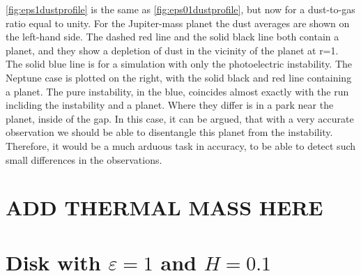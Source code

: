 \documentclass[onecolumn]{report}
\newcommand{\epsi}{\varepsilon}
\begin{document}
\ref{fig:eps1dustprofile} is the same as \ref{fig:eps01dustprofile}, but now for a dust-to-gas ratio equal to unity. For the Jupiter-mass planet the dust averages are shown on the left-hand side. The dashed red line and the solid black line both contain a planet, and they show a depletion of dust in the vicinity of the planet at r=1. The solid blue line is for a simulation with only the photoelectric instability. The Neptune case is plotted on the right, with the solid black and red line containing a planet. The pure instability, in the blue, coincides almost exactly with the run incliding the instability and a planet. Where they differ is in a park near the planet, inside of the gap. In this case, it can be argued, that with a very accurate observation we should be able to disentangle this planet from the instability. Therefore, it would be a much arduous task in accuracy, to be able to detect such small differences in the observations. 

\section{ADD THERMAL MASS HERE}

\section{Disk with $\epsi=1$ and $H=0.1$}
\end{document}
